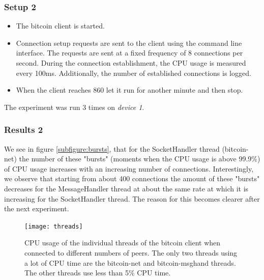 \subsubsection{Setup 2}
\begin{itemize}
	\item The bitcoin client is started.
	\item Connection setup requests are sent to the client using the command line interface. The requests are sent at a fixed frequency of 8 connections per second. During the connection establishment, the CPU usage is measured every 100ms. Additionally, the number of established connections is logged.
	\item When the client reaches 860 let it run for another minute and then stop.
\end{itemize}
The experiment was run 3 times on \textit{device 1}.\\
\subsubsection{Results 2}
 We see in figure \ref{subfigure:bursts}, that for the SocketHandler thread (bitcoin-net) the number of these "bursts" (moments when the CPU usage is above 99.9\%) of CPU usage increases with an increasing number of connections. Interestingly, we observe that starting from about 400 connections the amount of these "bursts" decreases for the MessageHandler thread at about the same rate at which it is increasing for the SocketHandler thread. The reason for this becomes clearer after the next experiment.\\


\begin{figure}[!pbt]
\begin{center}
\texttt{[image: threads]}
\caption[Per thread CPU usage]{CPU usage of the individual threads of the bitcoin client when connected to different numbers of peers. The only two threads using a lot of CPU time are the bitcoin-net and bitcoin-msghand threads. The other threads use less than 5\% CPU time.}
\label{fig:threads}
\end{center}
\end{figure}

